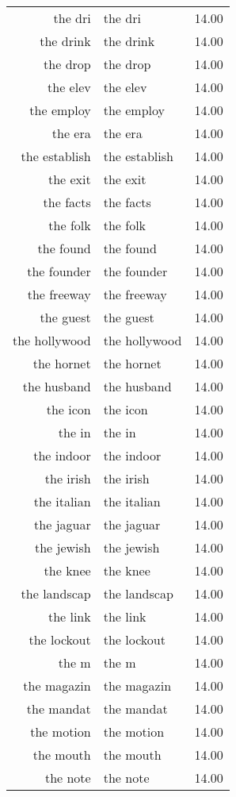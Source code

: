 \begin{table}[ht]
\begin{tabular}{rlr}
  the dri & the dri & 14.00 \\ 
  the drink & the drink & 14.00 \\ 
  the drop & the drop & 14.00 \\ 
  the elev & the elev & 14.00 \\ 
  the employ & the employ & 14.00 \\ 
  the era & the era & 14.00 \\ 
  the establish & the establish & 14.00 \\ 
  the exit & the exit & 14.00 \\ 
  the facts & the facts & 14.00 \\ 
  the folk & the folk & 14.00 \\ 
  the found & the found & 14.00 \\ 
  the founder & the founder & 14.00 \\ 
  the freeway & the freeway & 14.00 \\ 
  the guest & the guest & 14.00 \\ 
  the hollywood & the hollywood & 14.00 \\ 
  the hornet & the hornet & 14.00 \\ 
  the husband & the husband & 14.00 \\ 
  the icon & the icon & 14.00 \\ 
  the in & the in & 14.00 \\ 
  the indoor & the indoor & 14.00 \\ 
  the irish & the irish & 14.00 \\ 
  the italian & the italian & 14.00 \\ 
  the jaguar & the jaguar & 14.00 \\ 
  the jewish & the jewish & 14.00 \\ 
  the knee & the knee & 14.00 \\ 
  the landscap & the landscap & 14.00 \\ 
  the link & the link & 14.00 \\ 
  the lockout & the lockout & 14.00 \\ 
  the m & the m & 14.00 \\ 
  the magazin & the magazin & 14.00 \\ 
  the mandat & the mandat & 14.00 \\ 
  the motion & the motion & 14.00 \\ 
  the mouth & the mouth & 14.00 \\ 
  the note & the note & 14.00 \\ 

\end{tabular}
\end{table}
